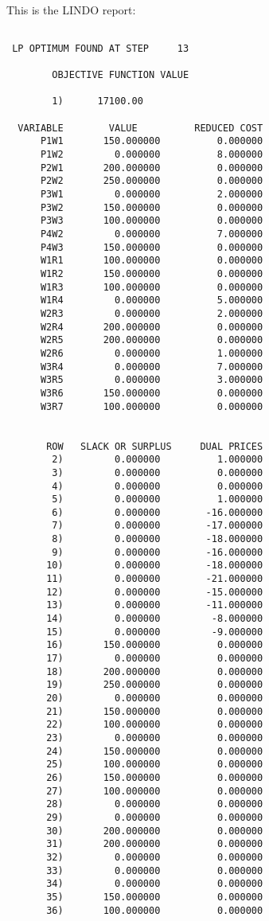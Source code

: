 \documentclass[12pt]{report}
\begin{document}
\\
This is the LINDO report:\\
\begin{verbatim}

 LP OPTIMUM FOUND AT STEP     13

        OBJECTIVE FUNCTION VALUE

        1)      17100.00

  VARIABLE        VALUE          REDUCED COST
      P1W1       150.000000          0.000000
      P1W2         0.000000          8.000000
      P2W1       200.000000          0.000000
      P2W2       250.000000          0.000000
      P3W1         0.000000          2.000000
      P3W2       150.000000          0.000000
      P3W3       100.000000          0.000000
      P4W2         0.000000          7.000000
      P4W3       150.000000          0.000000
      W1R1       100.000000          0.000000
      W1R2       150.000000          0.000000
      W1R3       100.000000          0.000000
      W1R4         0.000000          5.000000
      W2R3         0.000000          2.000000
      W2R4       200.000000          0.000000
      W2R5       200.000000          0.000000
      W2R6         0.000000          1.000000
      W3R4         0.000000          7.000000
      W3R5         0.000000          3.000000
      W3R6       150.000000          0.000000
      W3R7       100.000000          0.000000


       ROW   SLACK OR SURPLUS     DUAL PRICES
        2)         0.000000          1.000000
        3)         0.000000          0.000000
        4)         0.000000          0.000000
        5)         0.000000          1.000000
        6)         0.000000        -16.000000
        7)         0.000000        -17.000000
        8)         0.000000        -18.000000
        9)         0.000000        -16.000000
       10)         0.000000        -18.000000
       11)         0.000000        -21.000000
       12)         0.000000        -15.000000
       13)         0.000000        -11.000000
       14)         0.000000         -8.000000
       15)         0.000000         -9.000000
       16)       150.000000          0.000000
       17)         0.000000          0.000000
       18)       200.000000          0.000000
       19)       250.000000          0.000000
       20)         0.000000          0.000000
       21)       150.000000          0.000000
       22)       100.000000          0.000000
       23)         0.000000          0.000000
       24)       150.000000          0.000000
       25)       100.000000          0.000000
       26)       150.000000          0.000000
       27)       100.000000          0.000000
       28)         0.000000          0.000000
       29)         0.000000          0.000000
       30)       200.000000          0.000000
       31)       200.000000          0.000000
       32)         0.000000          0.000000
       33)         0.000000          0.000000
       34)         0.000000          0.000000
       35)       150.000000          0.000000
       36)       100.000000          0.000000


\end{verbatim}
\end{document}
